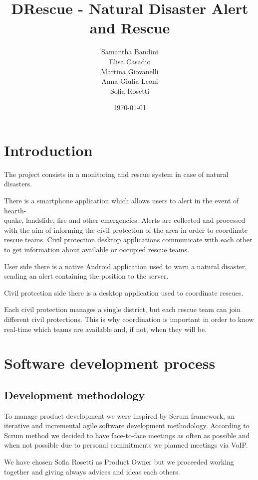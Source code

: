 \documentclass[a4paper,12pt]{report}
\title{DRescue - Natural Disaster Alert and Rescue}
\author{Samantha Bandini\\Elisa Casadio\\Martina Giovanelli\\Anna Giulia Leoni\\Sofia Rosetti}
\date{\today}
\begin{document}
\maketitle

\tableofcontents

\chapter{Introduction}

The project consists in a monitoring and rescue system in case of natural disasters. 

There is a smartphone application which allows users to alert in the event of hearth-\\quake, landslide, fire and other emergencies.
Alerts are collected and processed with the aim of informing the civil protection of the area in order to coordinate rescue teams.
Civil protection desktop applications communicate with each other to get information about available or occupied rescue teams.

User side there is a native Android application used to warn a natural disaster, sending an alert containing the position to the server.

Civil protection side there is a desktop application used to coordinate rescues.

Each civil protection manages a single district, but each rescue team can join different civil protections. This is why coordination is important in order to know real-time which teams are available and, if not, when they will be.


\chapter{Software development process}

\section{Development methodology}

To manage product development we were inspired by Scrum framework, an iterative and incremental agile software development methodology.
According to Scrum method we decided to have face-to-face meetings as often as possible and when not possible due to personal commitments we planned meetings via VoIP.

We have chosen Sofia Rosetti as Product Owner but we proceeded working together and giving always advices and ideas each others.
\end{document}
